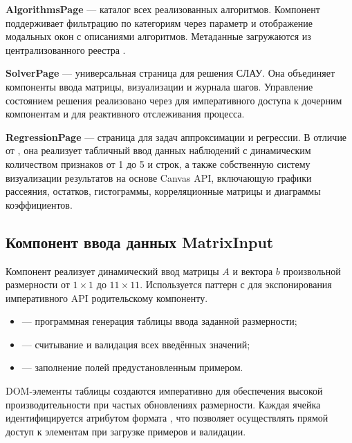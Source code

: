 \documentclass[12pt, oneside]{book}
\begin{document}
    \quad \textbf{AlgorithmsPage} --- каталог всех реализованных алгоритмов. Компонент поддерживает фильтрацию по категориям через параметр \texttt{} и отображение модальных окон с описаниями алгоритмов. Метаданные загружаются из централизованного реестра \texttt{}.

    \quad \textbf{SolverPage} --- универсальная страница для решения СЛАУ. Она объединяет компоненты ввода матрицы, визуализации и журнала шагов. Управление состоянием решения реализовано через \texttt{} для императивного доступа к дочерним компонентам и \texttt{} для реактивного отслеживания процесса.

    \quad \textbf{RegressionPage} --- страница для задач аппроксимации и регрессии. В отличие от \texttt{}, она реализует табличный ввод данных наблюдений с динамическим количеством признаков от 1 до 5 и строк, а также собственную систему визуализации результатов на основе Canvas API, включающую графики рассеяния, остатков, гистограммы, корреляционные матрицы и диаграммы коэффициентов.

\subsection{Компонент ввода данных MatrixInput}

    \quad Компонент \texttt{} реализует динамический ввод матрицы $A$ и вектора $b$ произвольной размерности от $1 \times 1$ до $11 \times 11$. Используется паттерн \texttt{} с \texttt{} для экспонирования императивного API родительскому компоненту.

\begin{itemize}
    \item \texttt{} --- программная генерация таблицы ввода заданной размерности;
    \item \texttt{} --- считывание и валидация всех введённых значений;
    \item \texttt{} --- заполнение полей предустановленным примером.
\end{itemize}

    \quad DOM-элементы таблицы создаются императивно для обеспечения высокой производительности при частых обновлениях размерности. Каждая ячейка идентифицируется атрибутом \texttt{} формата \texttt{}, что позволяет осуществлять прямой доступ к элементам при загрузке примеров и валидации.
\end{document}
